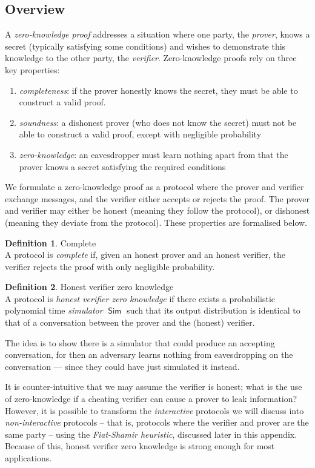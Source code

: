 \documentclass[11pt,twoside,a4paper]{article}
\DeclareMathOperator{\Sim}{\mathsf{Sim}}
\theoremstyle{definition}
\newtheorem{definition}{Definition}[section]
\begin{document}
\subsection{Overview}
A \textit{zero-knowledge proof} addresses a situation where one party, the \textit{prover}, knows a secret (typically satisfying some conditions) and wishes to demonstrate this knowledge to the other party, the \textit{verifier}. Zero-knowledge proofs rely on three key properties:
\begin{enumerate}
    \item \textit{completeness}: if the prover honestly knows the secret, they must be able to construct a valid proof.
    \item \textit{soundness}: a dishonest prover (who does not know the secret) must not be able to construct a valid proof, except with negligible probability
    \item \textit{zero-knowledge}: an eavesdropper must learn nothing apart from that the prover knows a secret satisfying the required conditions
\end{enumerate}
We formulate a zero-knowledge proof as a protocol where the prover and verifier exchange messages, and the verifier either accepts or rejects the proof. The prover and verifier may either be honest (meaning they follow the protocol), or dishonest (meaning they deviate from the protocol). These properties are formalised below.
\begin{definition}{Complete}\\
    A protocol is \textit{complete} if, given an honest prover and an honest verifier, the verifier rejects the proof with only negligible probability.
\end{definition}
\begin{definition}{Honest verifier zero knowledge}\\
    A protocol is \textit{honest verifier zero knowledge} if there exists a probabilistic polynomial time \textit{simulator} \(\Sim\) such that its output distribution is identical to that of a conversation between the prover and the (honest) verifier.
\end{definition}
The idea is to show there is a simulator that could produce an accepting conversation, for then an adversary learns nothing from eavesdropping on the conversation --- since they could have just simulated it instead.~\cite{boneh2015graduate}

It is counter-intuitive that we may assume the verifier is honest; what is the use of zero-knowledge if a cheating verifier can cause a prover to leak information? However, it is possible to transform the \textit{interactive} protocols we will discuss into \textit{non-interactive} protocols -- that is, protocols where the verifier and prover are the same party -- using the \textit{Fiat-Shamir heuristic}, discussed later in this appendix. Because of this, honest verifier zero knowledge is strong enough for most applications.
\end{document}
